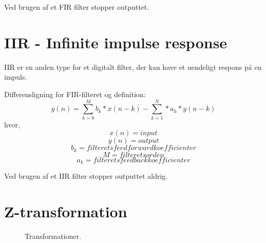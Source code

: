 \documentclass[12pt, letterpaper]{article}
\begin{document}
Ved brugen af et FIR filter stopper outputtet. 


\section{IIR - Infinite impulse response}

IIR er en anden type for et digitalt filter, der kan have et uendeligt respons på en impuls. 

Differensligning for FIR-filteret og definition: 
$$ y(n)= \sum\limits_{k=0}^{M} b_k * x(n-k) - \sum\limits_{k=1}^{N}*a_k *y(n-k) $$
hvor, 
$$ x(n) = input $$
$$ y(n) = output $$
$$ b_k = filterets feedforward koefficienter $$ 
$$ M = filterets orden $$
$$ a_k = filterets feedback koefficienter $$

Ved brugen af et IIR filter stopper outputtet aldrig. 


\section{Z-transformation}

\begin{figure}[!h]
           \begin{floatrow}
             		   			{\caption{Transformationer.}}
           \end{floatrow}
\end{figure}
\end{document}
